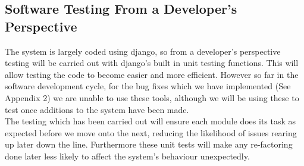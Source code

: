 \subsection*{Software Testing From a Developer’s Perspective}

The system is largely coded using django, so from a developer's perspective testing will be carried out with django’s built in unit testing functions. This will allow testing the code to become easier and more efficient. However so far in the software development cycle, for the bug fixes which we have implemented (See Appendix 2) we are unable to use these tools, although we will be using these to test once additions to the system have been made.\\

The testing which has been carried out will ensure each module does its task as expected before we move onto the next, reducing the likelihood of issues rearing up later down the line. Furthermore these unit tests will make any re-factoring done later less likely to affect the system's behaviour unexpectedly.\\
